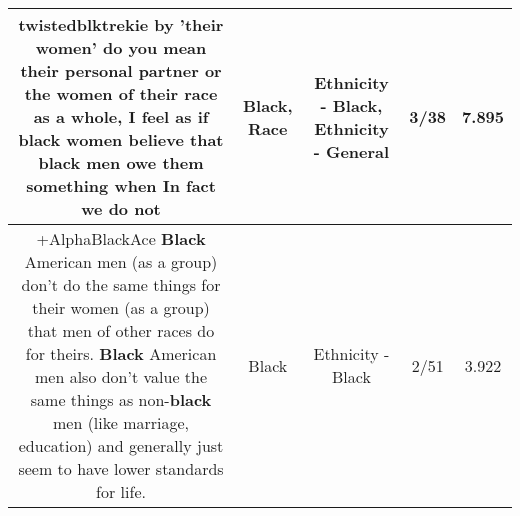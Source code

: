 \documentclass[11pt]{article}
\newlength\mylength
\begin{document}
\begin{center}
\begin{longtable}{|C{.65\mylength}|C{.30\mylength}|C{.12\mylength}|C{.12\mylength}|C{.12\mylength}|}
  \small twistedblktrekie by 'their women' do you mean their personal partner or the women of their \textbf{race} as a whole, I feel as if \textbf{black} women believe that \textbf{black} men owe them something when In fact we do not\normalsize   & Black, Race & Ethnicity - Black, Ethnicity - General & 3/38 & 7.895 \\  \hline
  \small +AlphaBlackAce \textbf{Black} American men (as a group) don't do the same things for their women (as a group) that men of other races do for theirs.  \textbf{Black} American men also don't value the same things as non-\textbf{black} men (like marriage, education) and generally just seem to have lower standards for life.\normalsize   & Black & Ethnicity - Black & 2/51 & 3.922 \\  \hline

\end{longtable}
\end{center}
\end{document}
